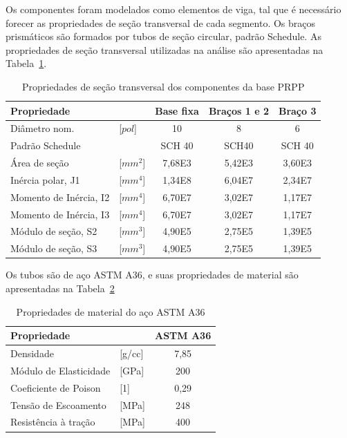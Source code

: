 Os componentes foram modelados como elementos de viga, tal que é necessário
forecer as propriedades de seção transversal de cada segmento. 
Os braços prismáticos são formados por tubos de seção circular, padrão Schedule.
As propriedades de seção transversal utilizadas na análise são apresentadas na
Tabela~\ref{tab::sectrans_schedules}.
%
\begin{table}[h]
\centering
\caption{Propriedades de seção transversal dos componentes da base PRPP}
\label{tab::sectrans_schedules}
\begin{tabular}{@{}llccc@{}}
\toprule
\textbf{Propriedade}   &           & \textbf{Base fixa} & \textbf{Braços 1 e 2} & \textbf{Braço 3} \\ \midrule
Diâmetro nom.          & [$pol$] & 10                 & 8                     & 6                \\
Padrão Schedule        &           & SCH 40             & SCH40                 & SCH 40           \\
Área de seção          & [$mm^2$]  & 7,68E3             & 5,42E3                & 3,60E3           \\
Inércia polar, J1      & [$mm^4$]  & 1,34E8             & 6,04E7               
& 2,34E7           \\
Momento de Inércia, I2 & [$mm^4$]  & 6,70E7             & 3,02E7                & 1,17E7           \\
Momento de Inércia, I3 & [$mm^4$]  & 6,70E7             & 3,02E7                & 1,17E7           \\
Módulo de seção, S2    & [$mm^3$]  & 4,90E5             & 2,75E5                & 1,39E5           \\
Módulo de seção, S3    & [$mm^3$]  & 4,90E5             & 2,75E5                & 1,39E5           \\ \bottomrule
\end{tabular}
\end{table}
%

Os tubos são de aço ASTM A36, e suas propriedades de material são
apresentadas na Tabela~\ref{tab::astma36}
%
\begin{table}[h]
\centering
\caption{Propriedades de material do aço ASTM A36}
\label{tab::astma36}
\begin{tabular}{@{}llc@{}}
\toprule
\textbf{Propriedade}   & \textbf{}  & \textbf{ASTM A36} \\ \midrule
Densidade              & {[}g/cc{]} & 7,85              \\
Módulo de Elasticidade & {[}GPa{]}  & 200               \\
Coeficiente de Poison  & {[}1{]}    & 0,29              \\
Tensão de Escoamento   & {[}MPa{]}  & 248               \\
Resistência à tração   & {[}MPa{]}  & 400               \\ \bottomrule
\end{tabular}
\end{table}
%


